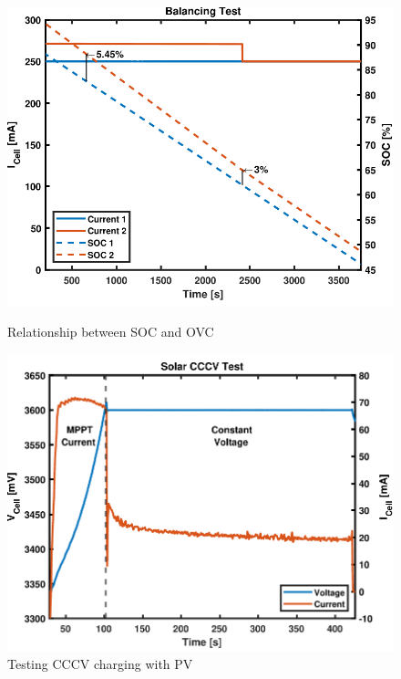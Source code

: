 \documentclass[10pt,twoside]{article}
\begin{document}
\begin{figure}[hbt!]
  \begin{minipage}[b]{0.44\textwidth}
    \centering
    \includegraphics[width=\textwidth]{Dissipate.pdf}
    \caption{Relationship between SOC and OVC}
    \label{fig:TestDissipation}
  \end{minipage}
  \hfill
  \begin{minipage}[b]{0.47\textwidth}
    \includegraphics[width=\textwidth]{PVCCCV.pdf}
    \caption{Testing CCCV charging with PV}
    \label{fig:CCCVPV}
  \end{minipage}
\end{figure}
\end{document}
